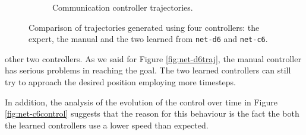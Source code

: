 \begin{figure}[!htb]
\begin{center}
\begin{subfigure}[h]{0.49\textwidth}
			\caption{Communication controller trajectories.}
		\end{subfigure}
	\end{center}
	\caption[Evaluation of the trajectories learned by \texttt{net-c6}.]{Comparison 
	of trajectories generated using four controllers: the 
	expert, the manual and the two learned from \texttt{net-d6} and 
	\texttt{net-c6}.}
	\label{fig:net-c6traj}
\end{figure}

\noindent
 other two controllers. As we said for Figure \ref{fig:net-d6traj}, the manual 
 controller has serious  problems in reaching the goal. The two learned controllers 
 can still try to approach the desired position employing more timesteps.

In addition, the analysis of the evolution of the control over time in Figure 
\ref{fig:net-c6control} suggests that the reason for this behaviour is the fact the 
both the learned controllers use a lower speed than expected.

